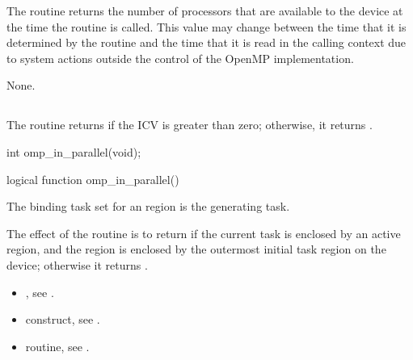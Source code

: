 \effect
The  routine returns the number of processors that are available 
to the device at the time the routine is called. This value may change between 
the time that it is determined by the  routine and the time that it 
is read in the calling context due to system actions outside the control of the OpenMP 
implementation.

\crossreferences
None.







\subsection{}
\label{subsec:omp_in_parallel}
\summary
The  routine returns  if the  ICV is greater 
than zero; otherwise, it returns .

\pagebreak
\format
\ccppspecificstart
\begin{boxedcode}
int omp\_in\_parallel(void);
\end{boxedcode}
\ccppspecificend

\fortranspecificstart
\begin{boxedcode}
logical function omp\_in\_parallel()
\end{boxedcode}
\fortranspecificend

\binding
The binding task set for an  region is the generating task.

\effect
The effect of the  routine is to return  if the current task is 
enclosed by an active  region, and the  region is enclosed by the 
outermost initial task region on the device; otherwise it returns .

\crossreferences
\begin{itemize}
\item {}, see 
.

\item {} construct, see 
.

\item {} routine, see 
.
\end{itemize}









